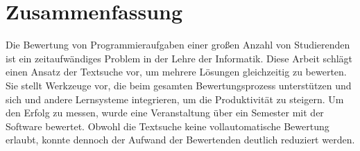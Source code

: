 \chapter*{Zusammenfassung}


Die Bewertung von Programmieraufgaben einer großen Anzahl von Studierenden ist ein zeitaufwändiges Problem in der Lehre der Informatik.
Diese Arbeit schlägt einen Ansatz der Textsuche vor, um mehrere Lösungen gleichzeitig zu bewerten.
Sie stellt Werkzeuge vor, die beim gesamten Bewertungsprozess unterstützen und sich und andere Lernsysteme integrieren, um die Produktivität zu steigern.
Um den Erfolg zu messen, wurde eine Veranstaltung über ein Semester mit der Software bewertet.
Obwohl die Textsuche keine vollautomatische Bewertung erlaubt, konnte dennoch der Aufwand der Bewertenden deutlich reduziert werden.
